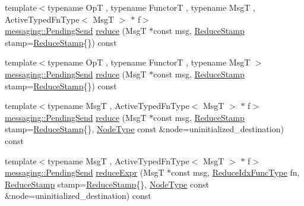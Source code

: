 \begin{DoxyCompactItemize}
{\footnotesize template$<$typename OpT , typename FunctorT , typename MsgT , Active\+Typed\+Fn\+Type$<$ Msg\+T $>$ $\ast$ f$>$ }\\\hyperlink{structvt_1_1messaging_1_1_pending_send}{messaging\+::\+Pending\+Send} \hyperlink{structvt_1_1vrt_1_1collection_1_1_reducable_a6550107ef0246a7479dec51b015aa0f5}{reduce} (MsgT $\ast$const msg, \hyperlink{structvt_1_1vrt_1_1collection_1_1_reducable_a19f80baf23f36dad4948ef07322fd0cb}{Reduce\+Stamp} stamp=\hyperlink{structvt_1_1vrt_1_1collection_1_1_reducable_a19f80baf23f36dad4948ef07322fd0cb}{Reduce\+Stamp}\{\}) const
\item 
{\footnotesize template$<$typename OpT , typename FunctorT , typename MsgT $>$ }\\\hyperlink{structvt_1_1messaging_1_1_pending_send}{messaging\+::\+Pending\+Send} \hyperlink{structvt_1_1vrt_1_1collection_1_1_reducable_a3333825bf69de10656ca60eeddff773d}{reduce} (MsgT $\ast$const msg, \hyperlink{structvt_1_1vrt_1_1collection_1_1_reducable_a19f80baf23f36dad4948ef07322fd0cb}{Reduce\+Stamp} stamp=\hyperlink{structvt_1_1vrt_1_1collection_1_1_reducable_a19f80baf23f36dad4948ef07322fd0cb}{Reduce\+Stamp}\{\}) const
\item 
{\footnotesize template$<$typename MsgT , Active\+Typed\+Fn\+Type$<$ Msg\+T $>$ $\ast$ f$>$ }\\\hyperlink{structvt_1_1messaging_1_1_pending_send}{messaging\+::\+Pending\+Send} \hyperlink{structvt_1_1vrt_1_1collection_1_1_reducable_adec41c02a8c43b709884107d96b729e4}{reduce} (MsgT $\ast$const msg, \hyperlink{structvt_1_1vrt_1_1collection_1_1_reducable_a19f80baf23f36dad4948ef07322fd0cb}{Reduce\+Stamp} stamp=\hyperlink{structvt_1_1vrt_1_1collection_1_1_reducable_a19f80baf23f36dad4948ef07322fd0cb}{Reduce\+Stamp}\{\}, \hyperlink{namespacevt_a866da9d0efc19c0a1ce79e9e492f47e2}{Node\+Type} const \&node=uninitialized\+\_\+destination) const
\item 
{\footnotesize template$<$typename MsgT , Active\+Typed\+Fn\+Type$<$ Msg\+T $>$ $\ast$ f$>$ }\\\hyperlink{structvt_1_1messaging_1_1_pending_send}{messaging\+::\+Pending\+Send} \hyperlink{structvt_1_1vrt_1_1collection_1_1_reducable_ac126400bba751792a930f4982df137c9}{reduce\+Expr} (MsgT $\ast$const msg, \hyperlink{structvt_1_1vrt_1_1collection_1_1_reducable_a9f5a6c385efafe1fa52937f4809a9486}{Reduce\+Idx\+Func\+Type} fn, \hyperlink{structvt_1_1vrt_1_1collection_1_1_reducable_a19f80baf23f36dad4948ef07322fd0cb}{Reduce\+Stamp} stamp=\hyperlink{structvt_1_1vrt_1_1collection_1_1_reducable_a19f80baf23f36dad4948ef07322fd0cb}{Reduce\+Stamp}\{\}, \hyperlink{namespacevt_a866da9d0efc19c0a1ce79e9e492f47e2}{Node\+Type} const \&node=uninitialized\+\_\+destination) const

\end{DoxyCompactItemize}
